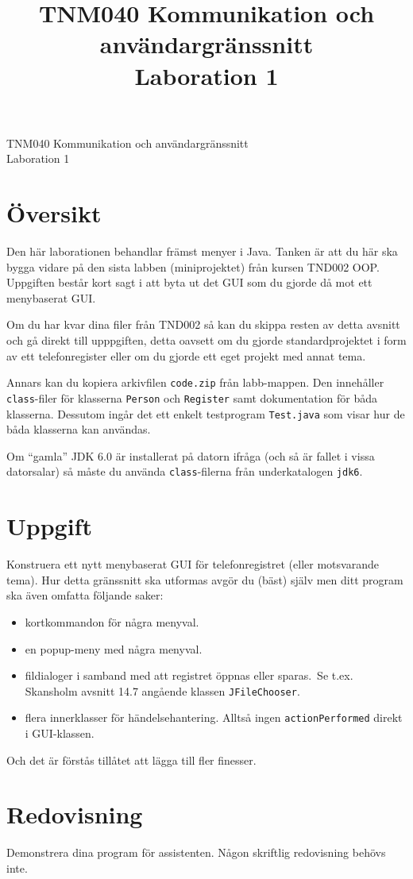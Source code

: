 \documentclass[11pt,a4paper]{article}
\begin{document}
\thispagestyle{empty}
\pagestyle{empty}

\title{TNM040 Kommunikation och användargränssnitt\\Laboration 1}

\begin{center}
  \LARGE TNM040 Kommunikation och användargränssnitt\\Laboration 1
\end{center}

\section*{Översikt}
Den här laborationen behandlar främst menyer i Java. Tanken är att du här ska bygga vidare på den sista labben (miniprojektet) från kursen TND002 OOP. Uppgiften består kort sagt i att byta ut det GUI som du gjorde då mot ett menybaserat GUI.

Om du har kvar dina filer från TND002 så kan du skippa resten av detta avsnitt och gå direkt till upppgiften, detta oavsett om du gjorde standardprojektet i form av ett telefonregister eller om du gjorde ett eget projekt med annat tema.

Annars kan du kopiera arkivfilen \texttt{code.zip} från labb-mappen. Den innehåller \texttt{class}-filer för klasserna \texttt{Person} och \texttt{Register} samt dokumentation för båda klasserna. Dessutom ingår det ett enkelt testprogram \texttt{Test.java} som visar hur de båda klasserna kan användas.

Om ``gamla'' JDK 6.0 är installerat på datorn ifråga (och så är fallet i vissa datorsalar) så måste du använda \texttt{class}-filerna från underkatalogen \texttt{jdk6}.

\section*{Uppgift}
Konstruera ett nytt menybaserat GUI för telefonregistret (eller motsvarande tema). Hur detta gränssnitt ska utformas avgör du (bäst) själv men ditt program ska även omfatta följande saker:

\begin{itemize}
  \item kortkommandon för några menyval.
  \item en popup-meny med några menyval.
  \item fildialoger i samband med att registret öppnas eller sparas. Se t.ex. Skansholm avsnitt 14.7 angående klassen \texttt{JFileChooser}.
  \item flera innerklasser för händelsehantering. Alltså ingen \texttt{actionPerformed} direkt i GUI-klassen.
\end{itemize}

Och det är förstås tillåtet att lägga till fler finesser.

\section*{Redovisning}

Demonstrera dina program för assistenten. Någon skriftlig redovisning behövs inte.
\end{document}
